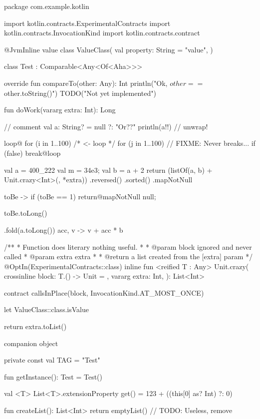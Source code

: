 \useOpTeX


\begtt {}
package com.example.kotlin

import kotlin.contracts.ExperimentalContracts
import kotlin.contracts.InvocationKind
import kotlin.contracts.contract

@JvmInline
value class ValueClass(
    val property: String = "value",
)

class Test : Comparable<Any<Of<Aha>>> {
    override fun compareTo(other: Any): Int {
        println("Ok, $other == ${other.toString()}")
        TODO("Not yet implemented")
    }

    fun doWork(vararg extra: Int): Long {
        // comment
        val a: String? = null ?: "Or??"
        println(a!!) // unwrap!
    
        loop@ for (i in 1..100) { /* <- loop */
            for (j in 1..100) {
                // FIXME: Never breaks...
                if (false) break@loop
            }
        }
        
        val a = 400_222
        val m = 34e3;
        val b = a + 2
        return (listOf(a, b) + Unit.crazy<Int>({}, *extra))
            .reversed()
            .sorted()
            .mapNotNull { toBe ->
                if (toBe == 1) {
                    return@mapNotNull null;
                }

                toBe.toLong()
            }
            .fold(a.toLong()) { acc, v -> v + acc * b }
    }

    /**
     * Function does literary nothing useful.
     *
     * @param block ignored and never called
     * @param extra extra
     *
     * @return a list created from the [extra] param
     */
    @OptIn(ExperimentalContracts::class)
    inline fun <reified T : Any> Unit.crazy(
        crossinline block: T.() -> Unit = {},
        vararg extra: Int,
    ): List<Int> {
        contract {
            callsInPlace(block, InvocationKind.AT_MOST_ONCE)
        }

        let {
            ValueClass::class.isValue
        }
        
        return extra.toList()
    }

    companion object {
        private const val TAG = "Test"

        fun getInstance(): Test = Test()
    }
}

val <T> List<T>.extensionProperty
    get() = 123 + ((this[0] as? Int) ?: 0)

fun createList(): List<Int> {
    return emptyList() // TODO: Useless, remove
}
\endtt
\bye
